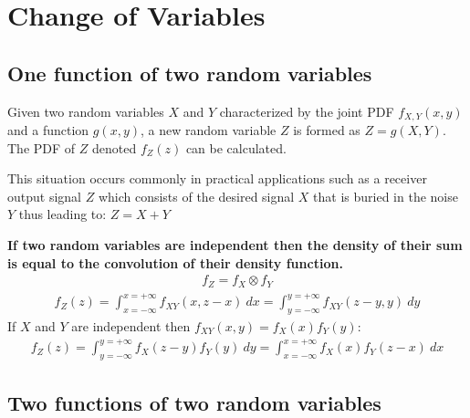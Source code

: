 \documentclass[10pt,a4paper]{article}
\begin{document}
\section{Change of Variables}
\subsection{One function of two random variables}

Given two random variables $X$ and $Y$ characterized by the joint PDF $f_{X,Y}(x, y)$ and a function $g(x, y)$, a new random
variable $Z$ is formed as $Z = g(X,Y)$. The PDF of $Z$ denoted $f_Z(z)$ can be calculated.

This situation occurs commonly in practical applications such as a receiver output signal $Z$ which
consists of the desired signal $X$ that is buried in the noise $Y$ thus leading to: $Z = X+Y$

\begin{tcolorbox}[breakable,colback=white]
\textbf{If two random variables are independent then the density of their sum is equal to the convolution of their density function.}
\begin{align*}
    f_Z = f_X \otimes f_Y
\end{align*}
\begin{align*}
    f_Z(z) = \int_{x=-\infty}^{x=+\infty} f_{XY}(x,z-x)\: dx = \int_{y=-\infty}^{y=+\infty} f_{XY}(z-y,y)\: dy 
\end{align*}
If $X$ and $Y$ are independent then $f_{XY}(x,y)=f_X(x)f_Y(y)$:
\begin{align*}
    f_Z(z)=\int_{y=-\infty}^{y=+\infty} f_X(z-y)f_Y(y)\:dy = \int_{x=-\infty}^{x=+\infty} f_X(x)f_Y(z-x)\:dx
\end{align*}
\end{tcolorbox}

\subsection{Two functions of two random variables}



\end{document}
